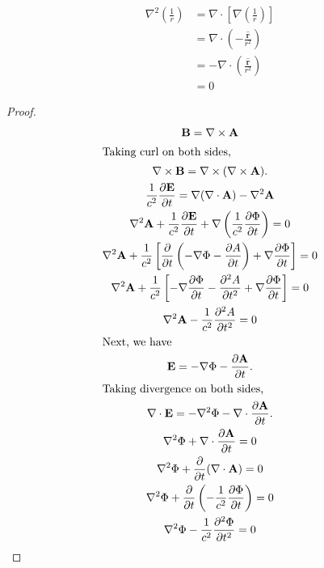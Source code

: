 \documentclass[12pt]{article}
\newenvironment{problem}[2][Problem]{\begin{trivlist}
\item[\hskip \labelsep {\bfseries #1}\hskip \labelsep {\bfseries #2.}]}{\end{trivlist}}
\begin{document}
\begin{problem}{3.d}
\end{problem}
\begin{align*}
	\nabla^2 \left( \frac{1}{r} \right) &= 
		\nabla \cdot \left[ \nabla \left( \frac{1}{r} \right) \right] \\
	&= \nabla \cdot \left( -\frac{\hat{\mathbf{r}}}{r^2} \right) \\
	&= -\nabla \cdot \left( \frac{\hat{\mathbf{r}}}{r^2} \right) \\
	&= 0
\end{align*}
\filbreak

\begin{problem}{4}
\end{problem}
\begin{proof}
\begin{gather*}
	\mathbf{B} = \nabla \times \mathbf{A} \\
	\shortintertext{Taking curl on both sides,}
	\nabla \times \mathbf{B} = \nabla \times (\nabla \times \mathbf{A}). \\
	\frac{1}{c^2} \frac{\partial \mathbf{E}}{\partial t} = \nabla (\nabla \cdot
		\mathbf{A}) - \nabla^2 \mathbf{A} \\
	\nabla^2 \mathbf{A} + \frac{1}{c^2} \frac{\partial \mathbf{E}}{\partial t}
		+ \nabla \left( \frac{1}{c^2} \frac{\partial \Phi}{\partial t} \right) = 0 \\
	\nabla^2 \mathbf{A} + \frac{1}{c^2} \left[ \frac{\partial}{\partial t} \left(
		- \nabla \Phi - \frac{\partial A}{\partial t} \right) + 
		\nabla \frac{\partial \Phi}{\partial t} \right] = 0 \\
	\nabla^2 \mathbf{A} + \frac{1}{c^2} \left[ -\nabla \frac{\partial
		\Phi}{\partial t} - \frac{\partial^2 A}{\partial t^2} 
		+ \nabla \frac{\partial \Phi}{\partial t} \right] = 0 \\
	\nabla^2 \mathbf{A} - \frac{1}{c^2} \frac{\partial^2 A}{\partial t^2} = 0 \\
	\shortintertext{Next, we have}
	\mathbf{E} = - \nabla \Phi - \frac{\partial \mathbf{A}}{\partial t}. \\
	\shortintertext{Taking divergence on both sides,}
	\nabla \cdot \mathbf{E} = - \nabla^2 \Phi - \nabla \cdot \frac{\partial
		\mathbf{A}}{\partial t}. \\
	\nabla^2 \Phi + \nabla \cdot \frac{\partial \mathbf{A}}{\partial t} = 0 \\
	\nabla^2 \Phi + \frac{\partial }{\partial t} (\nabla \cdot \mathbf{A}) = 0 \\
	\nabla^2 \Phi + \frac{\partial }{\partial t} \left(- \frac{1}{c^2}
		\frac{\partial \Phi}{\partial t} \right) = 0 \\
	\nabla^2 \Phi - \frac{1}{c^2} \frac{\partial^2 \Phi}{\partial t^2} = 0 \\
\end{gather*}
\end{proof}
\end{document}
